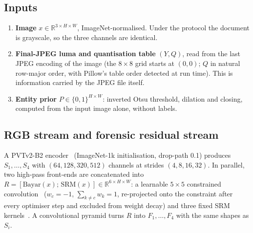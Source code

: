 \documentclass[11pt,a4paper]{article}
\newcommand{\R}{\mathbb{R}}
\begin{document}
\subsection{Inputs}
\begin{enumerate}[label=(\alph*)]
  \item \textbf{Image} $x\in\R^{3\times H\times W}$, ImageNet-normalised. Under the protocol the
        document is grayscale, so the three channels are identical.
  \item \textbf{Final-JPEG luma and quantisation table} $(Y,Q)$, read from the last JPEG
        encoding of the image (the $8\times8$ grid starts at $(0,0)$; $Q$ in natural row-major
        order, with Pillow's table order detected at run time). This is information carried by
        the JPEG file itself.
  \item \textbf{Entity prior} $P\in\{0,1\}^{H\times W}$: inverted Otsu threshold, dilation and
        closing, computed from the input image alone, without labels.
\end{enumerate}

\subsection{RGB stream and forensic residual stream}
A PVTv2-B2 encoder~\cite{pvtv2} (ImageNet-1k initialisation, drop-path 0.1) produces
$S_1,\dots,S_4$ with $(64,128,320,512)$ channels at strides $(4,8,16,32)$. In parallel, two
high-pass front-ends are concatenated into
$R=[\mathrm{Bayar}(x);\,\mathrm{SRM}(x)]\in\R^{6\times H\times W}$: a learnable $5\times5$
constrained convolution~\cite{bayar} ($w_c=-1$, $\sum_{k\neq c}w_k=1$, re-projected onto the
constraint after every optimiser step and excluded from weight decay) and three fixed SRM
kernels~\cite{srm}. A convolutional pyramid turns $R$ into $F_1,\dots,F_4$ with the same shapes
as $S_i$.
\end{document}
